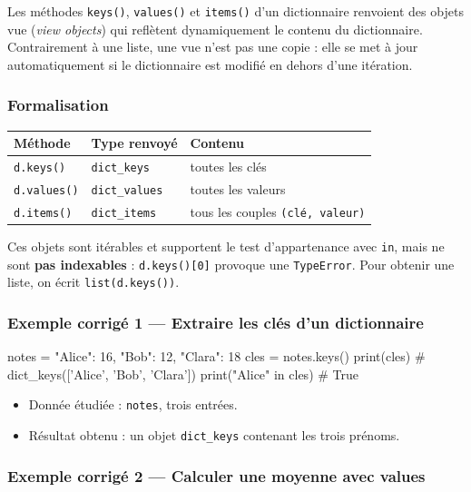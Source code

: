 Les méthodes \texttt{keys()}, \texttt{values()} et \texttt{items()} d'un
dictionnaire renvoient des objets vue (\emph{view objects}) qui
reflètent dynamiquement le contenu du dictionnaire. Contrairement à une
liste, une vue n'est pas une copie : elle se met à jour automatiquement
si le dictionnaire est modifié en dehors d'une itération.

\subsubsection{Formalisation}

\begin{longtable}[]{@{}lll@{}}
\toprule\noalign{}
Méthode & Type renvoyé & Contenu \\
\midrule\noalign{}
\endhead
\bottomrule\noalign{}
\endlastfoot
\texttt{d.keys()} & \texttt{dict\_keys} & toutes les clés \\
\texttt{d.values()} & \texttt{dict\_values} & toutes les valeurs \\
\texttt{d.items()} & \texttt{dict\_items} & tous les couples
\texttt{(clé,\ valeur)} \\
\end{longtable}

Ces objets sont itérables et supportent le test d'appartenance avec
\texttt{in}, mais ne sont \textbf{pas indexables} :
\texttt{d.keys(){[}0{]}} provoque une \texttt{TypeError}. Pour obtenir
une liste, on écrit \texttt{list(d.keys())}.

\subsubsection{Exemple corrigé 1 — Extraire les clés d’un dictionnaire}

\begin{python}
notes = {"Alice": 16, "Bob": 12, "Clara": 18}
cles = notes.keys()
print(cles)          # dict_keys(['Alice', 'Bob', 'Clara'])
print("Alice" in cles)  # True
\end{python}

\begin{itemize}
\tightlist
\item
  Donnée étudiée : \texttt{notes}, trois entrées.
\item
  Résultat obtenu : un objet \texttt{dict\_keys} contenant les trois
  prénoms.
\end{itemize}

\subsubsection{Exemple corrigé 2 — Calculer une moyenne avec values}

